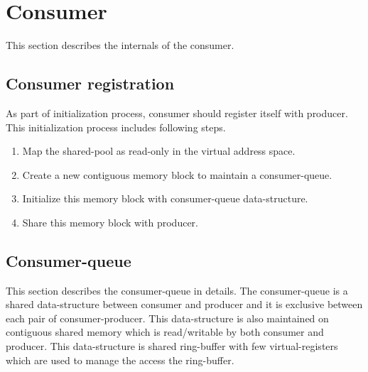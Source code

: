 \documentclass[a4paper,twoside]{report} %
\begin{document}
\section{Consumer}
This section describes the internals of the consumer.

\subsection{Consumer registration}
As part of initialization process, consumer should register itself
with producer.  This initialization process includes following steps.
\begin{enumerate} 
  \item Map the shared-pool as read-only in the virtual
  address space.
  \item Create a new contiguous memory block to maintain a consumer-queue.
  \item Initialize this memory block with consumer-queue
  data-structure. 
  \item Share this memory block with producer.
\end{enumerate} 


\subsection{Consumer-queue}
This section describes the consumer-queue in details.
The consumer-queue is a shared data-structure between consumer and
producer and it is exclusive between each pair of consumer-producer.
This data-structure is also maintained on contiguous shared memory 
which is read/writable by both consumer and producer.  This
data-structure is shared ring-buffer with few virtual-registers 
which are used to manage the access the ring-buffer.
\end{document}
